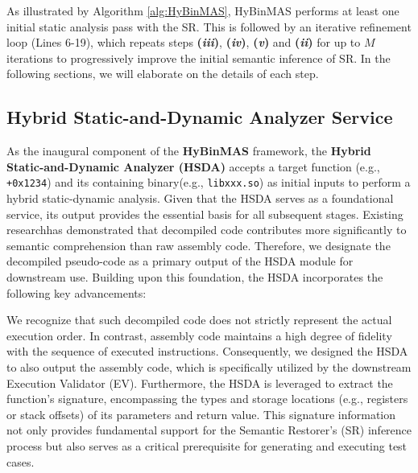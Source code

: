 \documentclass[acmsmall,screen,review,anonymous]{acmart} %
\begin{document}
As illustrated by Algorithm \ref{alg:HyBinMAS}, HyBinMAS performs at least one initial static analysis pass with the SR. This is followed by an iterative refinement loop (Lines 6-19), which repeats steps \textbf{(\textit{iii})}, \textbf{(\textit{iv})}, \textbf{(\textit{v})} and \textbf{(\textit{ii})} for up to $M$ iterations to progressively improve the initial semantic inference of SR. In the following sections, we will elaborate on the details of each step.



\subsection{Hybrid Static-and-Dynamic Analyzer Service}
\label{sec:hsda_design}

As the inaugural component of the \textbf{HyBinMAS} framework, the \textbf{Hybrid Static-and-Dynamic Analyzer (HSDA)} accepts a target function (e.g., \texttt{+0x1234}) and its containing binary(e.g., \texttt{libxxx.so}) as initial inputs to perform a hybrid static-dynamic analysis. Given that the HSDA serves as a foundational service, its output provides the essential basis for all subsequent stages. Existing research\cite{SymGen}has demonstrated that decompiled code contributes more significantly to semantic comprehension than raw assembly code. Therefore, we designate the decompiled pseudo-code as a primary output of the HSDA module for downstream use. Building upon this foundation, the HSDA incorporates the following key advancements:

We recognize that such decompiled code does not strictly represent the actual execution order. In contrast, assembly code maintains a high degree of fidelity with the sequence of executed instructions. Consequently, we designed the HSDA to also output the assembly code, which is specifically utilized by the downstream Execution Validator (EV). Furthermore, the HSDA is leveraged to extract the function's signature, encompassing the types and storage locations (e.g., registers or stack offsets) of its parameters and return value. This signature information not only provides fundamental support for the Semantic Restorer's (SR) inference process but also serves as a critical prerequisite for generating and executing test cases.
\end{document}
